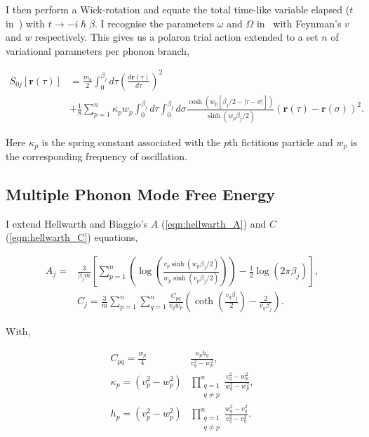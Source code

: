 I then perform a Wick-rotation and equate the total time-like variable elapsed ($t$ in~\cite{poulter_complete_1992}) with $t \rightarrow -i\hslash\beta$. I recognise the parameters $\omega$ and $\Omega$ in~\cite{poulter_complete_1992} with Feynman's $v$ and $w$ respectively. This gives us a polaron trial action extended to a set $n$ of variational parameters per phonon branch,

\begin{equation} \label{eqn:multi_trial_action}
    \begin{split}
        S_{0j}[\mathbf{r}(\tau)] &=
        \frac{m_b}{2}\int^{\beta_j}_0 d\tau \left(\frac{d\mathbf{r}(\tau)}{d\tau}\right)^2 \\
        &+ \frac{1}{8} \sum_{p = 1}^n \kappa_{p} w_{p} \int^{\beta_j}_0 d\tau \int^{\beta_j}_0 d\sigma \frac{\cosh{(w_{p}[\beta_j/2-|\tau-\sigma|])}}{\sinh{(w_{p}\beta_j/2)}}(\mathbf{r}(\tau) - \mathbf{r}(\sigma))^{2} .
    \end{split}
\end{equation}

Here $\kappa_{p}$ is the spring constant associated with the $p$th fictitious particle and $w_{p}$ is the corresponding frequency of oscillation. 

\subsection{Multiple Phonon Mode Free Energy}
\label{subsec:3-1-2}

I extend Hellwarth and Biaggio's $A$ (\ref{eqn:hellwarth_A}) and $C$ (\ref{eqn:hellwarth_C}) equations, 

\begin{subequations}
\begin{align}
    A_j = &\frac{3}{\beta_j m} \left[ \sum_{p = 1}^n \left( \log\left(\frac{v_{p} \sinh (w_{p} \beta_j / 2)}{w_{p} \sinh (v_{p} \beta_j / 2)}\right) \right) - \frac{1}{2} \log \left(2\pi\beta_j\right) \right] , \label{eqn:A} \\
    &C_j = \frac{3}{m} \sum_{p = 1}^n \sum_{q = 1}^n \frac{C_{pq}}{v_{q} w_{p}} \left( \coth \left( \frac{v_{q} \beta_j}{2} \right) - \frac{2}{v_{q} \beta_j} \right) . \label{eqn:C}
\end{align}
\end{subequations}

With, 

\begin{subequations}
    \begin{align}
        C_{pq} = \frac{w_{p}}{4} &\frac{\kappa_{p} h_{q}}{v_{q}^2 - w_{p}^2} ,\\
        \kappa_{p} = \left(v_{p}^2 - w_{p}^2 \right) &\prod\limits_{\substack{q=1 \\ q\neq p}}^n \frac{v_{q}^2 - w_{p}^2}{w_{q}^2 - w_{p}^2} ,\\
        h_{p} = \left( v_{p}^2 - w_{p}^2 \right) &\prod\limits_{\substack{q=1 \\ q\neq p}}^n \frac{w_{q}^2 - v_{q}^2}{v_{q}^2 - v_{q}^2} .
    \end{align}
\end{subequations}

